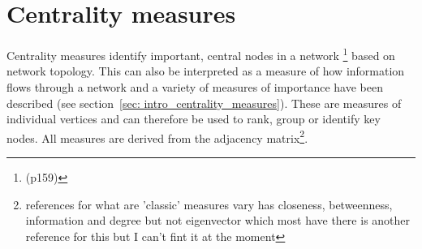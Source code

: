 \section{Centrality measures}
\label{sec:centrality measures}
Centrality measures identify important, central nodes in a network \cite{newman2018networks}\footnote{(p159)} based on network topology. This can also be interpreted as a measure of how information flows through a network \cite{borgatti2005centrality} and a variety of measures of importance have been described (see section~\ref{sec: intro_centrality_measures}). These are measures of individual vertices and can therefore be used to rank, group or identify key nodes. All measures are derived from the adjacency matrix\footnote{references for what are 'classic' measures vary \cite{cadini2008using} has closeness, betweenness, information and degree but not eigenvector which most have there is another reference for this but I can't fint it at the moment}.

